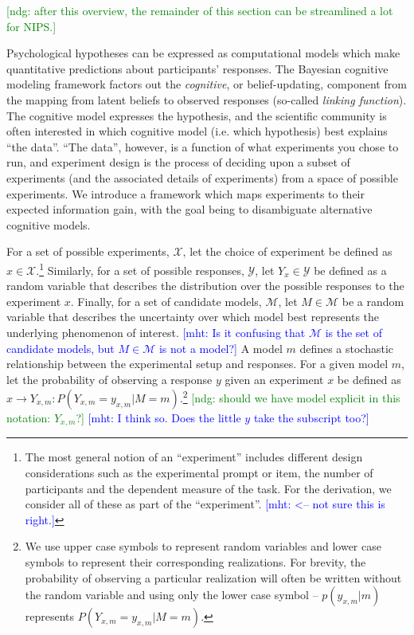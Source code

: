 \documentclass{article}
\newcommand{\ndg}[1]{\textcolor{Green}{[ndg: #1]}}
\newcommand{\mht}[1]{\textcolor{Blue}{[mht: #1]}}
\begin{document}
\ndg{after this overview, the remainder of this section can be streamlined a lot for NIPS.}

Psychological hypotheses can be expressed as computational models which make quantitative predictions about participants' responses.
The Bayesian cognitive modeling framework factors out the \emph{cognitive}, or belief-updating, component from the mapping from latent beliefs to observed responses (so-called \emph{linking function}).
The cognitive model expresses the hypothesis, and the scientific community is often interested in which cognitive model (i.e. which hypothesis) best explains ``the data''.
``The data'', however, is a function of what experiments you chose to run, and experiment design is the process of deciding upon a subset of experiments (and the associated details of experiments) from a space of possible experiments.
We introduce a framework which maps experiments to their expected information gain, with the goal being to disambiguate alternative cognitive models.

For a set of possible experiments, $\mathcal{X}$, let the choice of experiment be defined as $x \in \mathcal{X}$.\footnote{
The most general notion of an ``experiment'' includes different design considerations such as the experimental prompt or item, the number of participants and the dependent measure of the task.  For the derivation, we consider all of these as part of the ``experiment''. \mht{<-- not sure this is right.}
}
Similarly, for a set of possible responses, $\mathcal{Y}$, let $Y_x \in \mathcal{Y}$ be defined as a random variable that describes the distribution over the possible responses to the experiment $x$.
Finally, for a set of candidate models, $\mathcal{M}$, let $M \in \mathcal{M}$ be a random variable that describes the uncertainty over which model best represents the underlying phenomenon of interest.
\mht{ Is it confusing that  $\mathcal{M}$ is the set of candidate models, but $M \in \mathcal{M}$ is not a model?}
A model $m$ defines a stochastic relationship between the experimental setup and responses.
For a given model $m$, let the probability of observing a response $y$ given an experiment $x$ be defined as $x \rightarrow Y_{x,m}: P(Y_{x,m} = y_{x,m} | M = m)$.\footnote{
We use upper case symbols to represent random variables and lower case symbols to represent their corresponding realizations. For brevity, the probability of observing a particular realization will often be written without the random variable and using only the lower case symbol -- $p(y_{x,m} |m)$ represents $P(Y_{x,m} = y_{x,m} | M = m)$.
}
\ndg{should we have model explicit in this notation: $Y_{x,m}$?} \mht{I think so. Does the little $y$ take the subscript too?}
\end{document}
